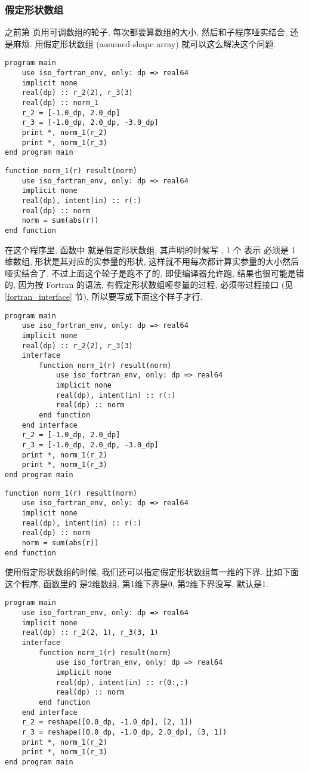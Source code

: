 \subsubsection{假定形状数组} \label{assumed-shape} 

之前第 \pageref{adjustable_array} 页用可调数组的轮子, 每次都要算数组的大小, 然后和子程序哑实结合, 还是麻烦. 用假定形状数组 (assumed-shape array) 就可以这么解决这个问题. 
\begin{lstlisting} 
program main
    use iso_fortran_env, only: dp => real64
    implicit none
    real(dp) :: r_2(2), r_3(3)
    real(dp) :: norm_1
    r_2 = [-1.0_dp, 2.0_dp]
    r_3 = [-1.0_dp, 2.0_dp, -3.0_dp]
    print *, norm_1(r_2)
    print *, norm_1(r_3)
end program main
\end{lstlisting}
\begin{lstlisting}
function norm_1(r) result(norm)
    use iso_fortran_env, only: dp => real64
    implicit none
    real(dp), intent(in) :: r(:)
    real(dp) :: norm
    norm = sum(abs(r))
end function
\end{lstlisting} 
在这个程序里, 函数中  就是假定形状数组, 其声明的时候写 , 1 个 \ttt{:} 表示  必须是 1 维数组, 形状是其对应的实参量的形状, 这样就不用每次都计算实参量的大小然后哑实结合了. 不过上面这个轮子是跑不了的, 即使编译器允许跑, 结果也很可能是错的, 因为按 Fortran 的语法, 有假定形状数组哑参量的过程, 必须带过程接口 (见 \ref{fortran_interface} 节), 所以要写成下面这个样子才行.\label{assumed-shape_array_program} 
\begin{lstlisting} 
program main
    use iso_fortran_env, only: dp => real64
    implicit none
    real(dp) :: r_2(2), r_3(3)
    interface
        function norm_1(r) result(norm)
            use iso_fortran_env, only: dp => real64
            implicit none
            real(dp), intent(in) :: r(:)
            real(dp) :: norm
        end function
    end interface
    r_2 = [-1.0_dp, 2.0_dp]
    r_3 = [-1.0_dp, 2.0_dp, -3.0_dp]
    print *, norm_1(r_2)
    print *, norm_1(r_3)
end program main
\end{lstlisting}
\begin{lstlisting}
function norm_1(r) result(norm)
    use iso_fortran_env, only: dp => real64
    implicit none
    real(dp), intent(in) :: r(:)
    real(dp) :: norm
    norm = sum(abs(r))
end function
\end{lstlisting} 
使用假定形状数组的时候, 我们还可以指定假定形状数组每一维的下界. 比如下面这个程序, 函数里的  是2维数组, 第1维下界是0, 第2维下界没写, 默认是1. 
\begin{lstlisting} 
program main
    use iso_fortran_env, only: dp => real64
    implicit none
    real(dp) :: r_2(2, 1), r_3(3, 1)
    interface
        function norm_1(r) result(norm)
            use iso_fortran_env, only: dp => real64
            implicit none
            real(dp), intent(in) :: r(0:,:)
            real(dp) :: norm
        end function
    end interface
    r_2 = reshape([0.0_dp, -1.0_dp], [2, 1])
    r_3 = reshape([0.0_dp, -1.0_dp, 2.0_dp], [3, 1])
    print *, norm_1(r_2)
    print *, norm_1(r_3)
end program main
\end{lstlisting}
